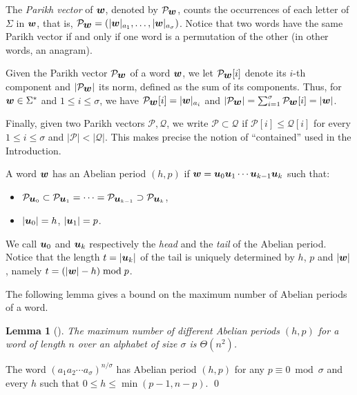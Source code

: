 \documentclass[3p]{elsarticle}
\def\PV{\mathcal{P}}
\def\PVW{\mathcal{P}_{\s{w}}}
\def\QV{\mathcal{Q}}
\newtheorem{lem}[thm]{Lemma}
\def\s#1{\mbox{\boldmath $#1$}}
\begin{document}
The \emph{Parikh vector} of $\s{w}$, denoted by $\PVW$,
 counts the
 occurrences of each letter of $\Sigma$ in $\s{w}$, that is, 
 $\PVW=(|\s{w}|_{a_{1}},\ldots,|\s{w}|_{a_{\sigma}})$.
Notice that two words have the same Parikh vector if and only if
 one word is a permutation of the other (in other words, an anagram).

Given the Parikh vector $\PVW$ of a word $\s{w}$, we let $\PVW [i]$ denote its
 $i$-th component and $|\PVW|$ its norm, defined as the sum of its components.
Thus, for $\s{w}\in\Sigma^*$ and $1\leqslant i\leqslant\sigma$, we have
 $\PVW [i]=|\s{w}|_{a_i}$ and $|\PVW|=\sum_{i=1}^{\sigma}\PVW[i]=|\s{w}|$.

Finally, given two Parikh vectors $\PV,\QV$, we write $\PV\subset \QV$ if
 $\PV[i]\leqslant \QV[i]$
 for every $1\leqslant i\leqslant \sigma$ and $|\PV|<|\QV|$. 
This makes precise the notion of ``contained'' used in the Introduction.
 
\begin{defi}
\label{def-ap}
A word $\s{w}$ has an Abelian period $(h,p)$ if
 $\s{w}=\s{u}_0\s{u}_1 \cdots \s{u}_{k-1}\s{u}_{k}$ 
 such that:

\begin{itemize}
 \item $\PV_{\s{u}_{0}}\subset \PV_{\s{u}_{1}}=\cdots =\PV_{\s{u}_{k-1}}\supset \PV_{\s{u}_{k}}$,
 \item $|\s{u}_{0}|=h$, $|\s{u}_{1}|=p$.
\end{itemize}

\end{defi}

We call $\s{u}_0$ and $\s{u}_k$ respectively the \emph{head} and the
 \emph{tail}  of the Abelian period.
 Notice that the length $t=|\s{u}_k|$ of the tail is uniquely determined
 by $h$, $p$ and $|\s{w}|$, namely $t=(|\s{w}|-h) \bmod p$. 

The following lemma gives a bound on the maximum number of Abelian periods
 of a word.
\begin{lem}[\cite{PSC2011-16}]
\label{lemma-max}
The maximum number of different Abelian periods $(h,p)$ for a word of length $n$ over
 an alphabet of size $\sigma$
 is $\Theta(n^2)$.
\end{lem}

\begin{pf}
The word $(a_{1}a_{2}\cdots a_{\sigma})^{n/\sigma}$ has Abelian period
 $(h,p)$ for any $p\equiv 0 \bmod \sigma$ and every $h$ such that 
 $0 \leqslant h \leqslant \min(p-1,n-p)$. \qed
\end{pf}
\end{document}
